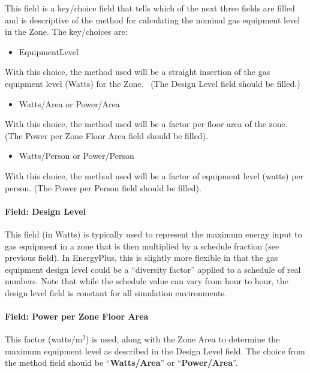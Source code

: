 This field is a key/choice field that tells which of the next three fields are filled and is descriptive of the method for calculating the nominal gas equipment level in the Zone. The key/choices are:

\begin{itemize}
\tightlist
\item
  EquipmentLevel
\end{itemize}

With this choice, the method used will be a straight insertion of the gas equipment level (Watts) for the Zone.~ (The Design Level field should be filled.)

\begin{itemize}
\tightlist
\item
  Watts/Area or Power/Area
\end{itemize}

With this choice, the method used will be a factor per floor area of the zone. (The Power per Zone Floor Area field should be filled).

\begin{itemize}
\tightlist
\item
  Watts/Person or Power/Person
\end{itemize}

With this choice, the method used will be a factor of equipment level (watts) per person. (The Power per Person field should be filled).

\paragraph{Field: Design Level}\label{field-design-level-1-000}

This field (in Watts) is typically used to represent the maximum energy input to gas equipment in a zone that is then multiplied by a schedule fraction (see previous field). In EnergyPlus, this is slightly more flexible in that the gas equipment design level could be a ``diversity factor'' applied to a schedule of real numbers. Note that while the schedule value can vary from hour to hour, the design level field is constant for all simulation environments.

\paragraph{Field: Power per Zone Floor Area}\label{field-power-per-zone-floor-area}

This factor (watts/m\(^{2}\)) is used, along with the Zone Area to determine the maximum equipment level as described in the Design Level field. The choice from the method field should be ``\textbf{Watts/Area}'' or ``\textbf{Power/Area}''.


